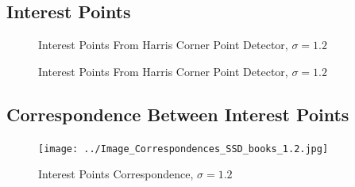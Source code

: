 \documentclass{article}
\begin{document}
\subsection{Interest Points}
\begin{figure}[!htbp]
     \centering
    \captionsetup[subfigure]{labelformat=empty}
    \caption{Interest Points From Harris Corner Point Detector, $\sigma=1.2$}
\end{figure}

\begin{figure}[!htbp]
     \centering
    \captionsetup[subfigure]{labelformat=empty}
    \caption{Interest Points From Harris Corner Point Detector, $\sigma=1.2$}
\end{figure}
\newpage
\subsection{Correspondence Between Interest Points}
\begin{figure}[!htbp]
     \centering
    \texttt{[image: ../Image\_Correspondences\_SSD\_books\_1.2.jpg]}
    \caption{Interest Points Correspondence, $\sigma=1.2$}
\end{figure}
\end{document}
